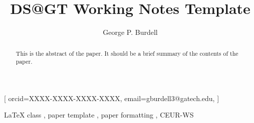 \documentclass[]{style/ceurart}
\begin{document}


\title{DS@GT Working Notes Template}

\author[1]{George P. Burdell}[
    orcid=XXXX-XXXX-XXXX-XXXX,
    email=gburdell3@gatech.edu,
]
\cormark[1]

\address[1]{Georgia Institute of Technology, North Ave NW, Atlanta, GA 30332}

\begin{abstract}
    This is the abstract of the paper. 
    It should be a brief summary of the contents of the paper.
\end{abstract}

\begin{keywords}
  LaTeX class \sep
  paper template \sep
  paper formatting \sep
  CEUR-WS
\end{keywords}

\maketitle




\end{document}
